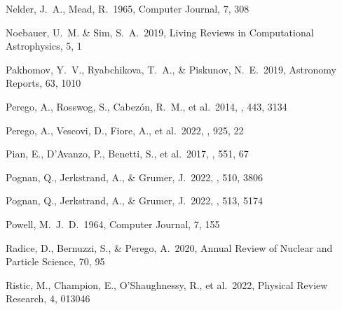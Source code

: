 \documentclass[twocolumn, twocolappendix]{aastex63}
\begin{document}
\begin{thebibliography}{}
 Nelder, J.~A., Mead, R.\ 1965, Computer Journal, 7, 308


 Noebauer, U.~M. \& Sim, S.~A.\ 2019, Living Reviews in Computational Astrophysics, 5, 1



 Pakhomov, Y.~V., Ryabchikova, T.~A., \& Piskunov, N.~E.\ 2019, Astronomy Reports, 63, 1010




 Perego, A., Rosswog, S., Cabez{\'o}n, R.~M., et al.\ 2014, \mnras, 443, 3134


 Perego, A., Vescovi, D., Fiore, A., et al.\ 2022, \apj, 925, 22


 Pian, E., D'Avanzo, P., Benetti, S., et al.\ 2017, \nat, 551, 67




 Pognan, Q., Jerkstrand, A., \& Grumer, J.\ 2022, \mnras, 510, 3806

 Pognan, Q., Jerkstrand, A., \& Grumer, J.\ 2022, \mnras, 513, 5174


 Powell, M.~J.~D.\ 1964, Computer Journal, 7, 155






 Radice, D., Bernuzzi, S., \& Perego, A.\ 2020, Annual Review of Nuclear and Particle Science, 70, 95


 Ristic, M., Champion, E., O'Shaughnessy, R., et al.\ 2022, Physical Review Research, 4, 013046



\end{thebibliography}
\end{document}
